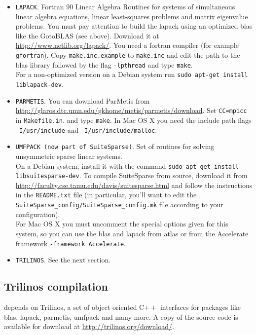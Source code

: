 \begin{itemize}
\item \verb!LAPACK!.
Fortran $90$ Linear Algebra Routines for systems of simultaneous linear algebra equations, linear least-squares problems
and matrix eigenvalue problems. You must pay attention to build the lapack using an optimized blas like the GotoBLAS (see above). Download it at \url{http://www.netlib.org/lapack/}. You need a fortran compiler (for example \verb!gfortran!).
Copy \verb!make.inc.example! to \verb!make.inc! and edit the path to the blas library followed by the flag \verb!-lpthread!
and type \verb!make!.\\
For a non-optimized version on a Debian system run \verb!sudo apt-get install liblapack-dev!.

\item \verb!PARMETIS!.
You can download ParMetis from \url{http://glaros.dtc.umn.edu/gkhome/metis/parmetis/download}. Set \verb!CC=mpicc!
in \verb!Makefile.in!. and type \verb!make!. In Mac OS X you need the include path flags
\verb!-I/usr/include! and \verb!-I/usr/include/malloc!.

\item \verb!UMFPACK (now part of SuiteSparse)!.
Set of routines for solving unsymmetric sparse linear systems.\\
On a Debian system, install it with the command \verb!sudo apt-get install libsuitesparse-dev!.
To compile SuiteSparse from source, download it from \url{http://faculty.cse.tamu.edu/davis/suitesparse.html} and follow the instructions in the \verb!README.txt! file (in particular, you'll want to edit the \verb!SuiteSparse_config/SuiteSparse_config.mk! file according to your configuration).\\
For Mac OS X you must uncomment the special options given for this system, so you can use the blas and lapack
from atlas or from the Accelerate framework \verb!-framework Accelerate!.

\item \verb!TRILINOS!. See the next section.

\end{itemize}

\subsection{Trilinos compilation}
\lifev depends on Trilinos, a set of object oriented C$++$ interfaces for packages like
blas, lapack, parmetis, umfpack and many more. A copy of the source
code is available for download at \url{http://trilinos.org/download/}.

